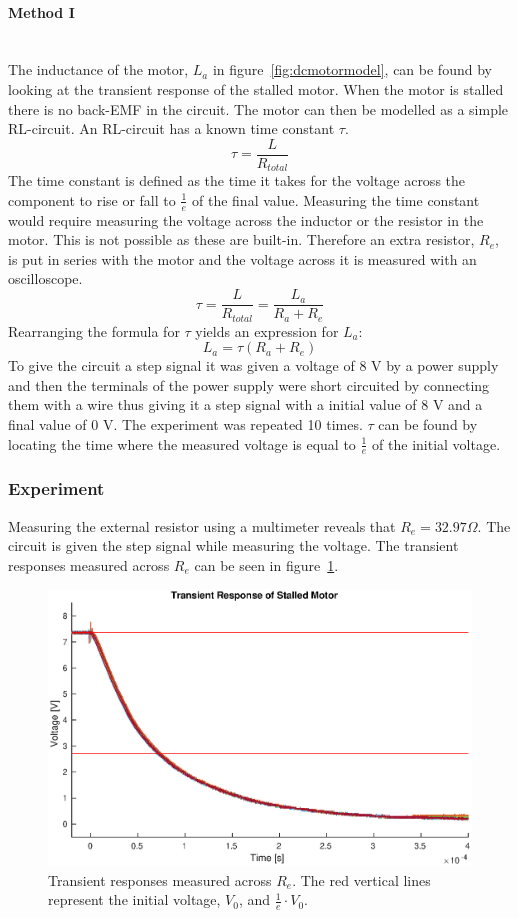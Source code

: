 \paragraph{Method I}~\\
The inductance of the motor, $L_a$ in figure~\ref{fig:dcmotormodel}, can be found by looking at the transient response of the stalled motor. 
When the motor is stalled there is no back-EMF in the circuit. The motor can then be modelled as a simple RL-circuit. 
An RL-circuit has a known time constant $\tau$.
$$\tau = \frac{L}{R_{total}}$$
The time constant is defined as the time it takes for the voltage across the component to rise or fall to $\frac{1}{e}$ of the final value.
Measuring the time constant would require measuring the voltage across the inductor or the resistor in the motor. This is not possible as these are built-in. 
Therefore an extra resistor, $R_e$, is put in series with the motor and the voltage across it is measured with an oscilloscope. 
$$\tau = \frac{L}{R_{total}} = \frac{L_a}{R_a+R_e}$$
Rearranging the formula for $\tau$ yields an expression for $L_a$: 
$$L_a = \tau (R_a + R_e)$$
To give the circuit a step signal it was given a voltage of 8 V by a power supply and then the terminals of the power supply were short circuited by connecting them with a wire thus giving it a step signal with a initial value of 8 V and a final value of 0 V.
The experiment was repeated 10 times. $\tau$ can be found by locating the time where the measured voltage is equal to $\frac{1}{e}$ of the initial voltage.

\subsubsection{Experiment}
Measuring the external resistor using a multimeter reveals that $R_e = 32.97\Omega$.
The circuit is given the step signal while measuring the voltage.
The transient responses measured across $R_e$ can be seen in figure~\ref{fig:trans_plot}.

\begin{figure}[!h]
	\centering
	\includegraphics[width=.75\linewidth]{graphics/transient_32ohm}
	\caption[Transient responses measured across $R_e$.]{Transient responses measured across $R_e$. The red vertical lines represent the initial voltage, $V_0$, and $\frac{1}{e} \cdot V_0$.}
	\label{fig:trans_plot}
\end{figure}


